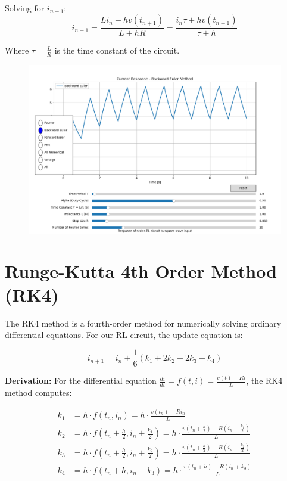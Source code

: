 \documentclass[12pt,a4paper]{report}
\begin{document}
Solving for $i_{n+1}$:
\begin{equation}
i_{n+1} = \frac{Li_n + hv(t_{n+1})}{L + hR} = \frac{i_n\tau + hv(t_{n+1})}{\tau + h}
\end{equation}

Where $\tau = \frac{L}{R}$ is the time constant of the circuit.

\begin{figure}[h!]
	\centering
	\includegraphics[scale=0.5]{figs/BackwardEuler-numerical.png}
        \end{figure}

\section{Runge-Kutta 4th Order Method (RK4)}
The RK4 method is a fourth-order method for numerically solving ordinary differential equations. For our RL circuit, the update equation is:

\begin{equation}
i_{n+1} = i_n + \frac{1}{6}(k_1 + 2k_2 + 2k_3 + k_4)
\end{equation}

\textbf{Derivation:}
For the differential equation $\frac{di}{dt} = f(t, i) = \frac{v(t) - Ri}{L}$, the RK4 method computes:

\begin{align}
k_1 &= h \cdot f(t_n, i_n) = h \cdot \frac{v(t_n) - Ri_n}{L} \\
k_2 &= h \cdot f(t_n + \frac{h}{2}, i_n + \frac{k_1}{2}) = h \cdot \frac{v(t_n + \frac{h}{2}) - R(i_n + \frac{k_1}{2})}{L} \\
k_3 &= h \cdot f(t_n + \frac{h}{2}, i_n + \frac{k_2}{2}) = h \cdot \frac{v(t_n + \frac{h}{2}) - R(i_n + \frac{k_2}{2})}{L} \\
k_4 &= h \cdot f(t_n + h, i_n + k_3) = h \cdot \frac{v(t_n + h) - R(i_n + k_3)}{L}
\end{align}
\end{document}
